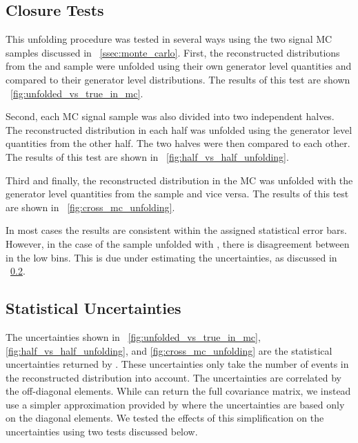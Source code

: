 \subsection{Closure Tests}

This unfolding procedure was tested in several ways using the two signal MC
samples discussed in \SEC~\ref{ssec:monte_carlo}. First, the reconstructed
\phistar distributions from the \MADGRAPH and \POWHEG sample were unfolded
using their own generator level quantities and compared to their generator
level \phistar distributions. The results of this test are shown
\FIG~\ref{fig:unfolded_vs_true_in_mc}.


Second, each MC signal sample was also divided into two independent halves.
The reconstructed \phistar distribution in each half was unfolded using the
generator level quantities from the other half. The two halves were then
compared to each other. The results of this test are shown in
\FIG~\ref{fig:half_vs_half_unfolding}.


Third and finally, the reconstructed \phistar distribution in the \MADGRAPH
MC was unfolded with the generator level quantities from the \POWHEG sample and
vice versa. The results of this test are shown in
\FIG~\ref{fig:cross_mc_unfolding}.


In most cases the results are consistent within the assigned statistical error
bars. However, in the case of the \MADGRAPH sample unfolded with \POWHEG, there
is disagreement between in the low \phistar bins. This is due \RooUnfold under
estimating the uncertainties, as discussed in
\SEC~\ref{ssec:unfolding_statistical_uncertainties}.

\subsection{Statistical Uncertainties}
\label{ssec:unfolding_statistical_uncertainties}

The uncertainties shown in \FIGS~\ref{fig:unfolded_vs_true_in_mc},
\ref{fig:half_vs_half_unfolding}, and \ref{fig:cross_mc_unfolding} are the
statistical uncertainties returned by \RooUnfold. These uncertainties only take
the number of events in the reconstructed distribution into account. The
uncertainties are correlated by the off-diagonal elements. While \RooUnfold can
return the full covariance matrix, we instead use a simpler approximation
provided by \RooUnfold where the uncertainties are based only on the diagonal
elements. We tested the effects of this simplification on the uncertainties
using two tests discussed below.

